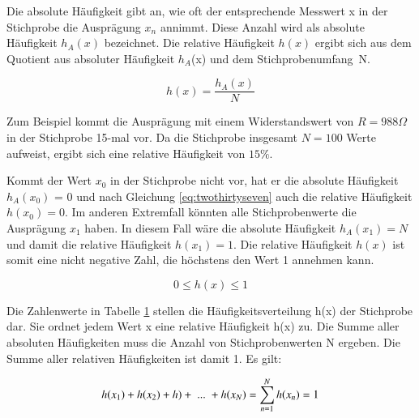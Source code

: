 \begin{table}[H]
{\begin{tabular}{| c | c | c | c | c | c |}
\parbox[c][0.28in][c]{0.97in}{} &
\parbox[c][0.28in][c]{0.97in}{} &
\parbox[c][0.28in][c]{0.97in}{} &
\parbox[c][0.28in][c]{0.97in}{} &
\parbox[c][0.28in][c]{0.97in}{} &
\parbox[c][0.28in][c]{0.97in}{} \\ \hline

\end{tabular}%
}\bigskip
\label{tab:threethree}
\end{table}

\noindent Die absolute H\"{a}ufigkeit gibt an, wie oft der entsprechende Messwert x in der Stichprobe die Auspr\"{a}gung $x{}_{n}$ annimmt. Diese Anzahl wird als absolute H\"{a}ufigkeit $h{}_{A}(x)$ bezeichnet. Die relative H\"{a}ufigkeit $h(x)$ ergibt sich aus dem Quotient aus absoluter H\"{a}ufigkeit $h{}_{A}$(x) und dem Stichprobenumfang~N.

\begin{equation}\label{eq:threetwo}
h(x)=\dfrac{h_{A} (x)}{N} 
\end{equation}

\noindent Zum Beispiel kommt die Auspr\"{a}gung mit einem Widerstandswert von $R = 988 \Omega$ in der Stichprobe 15-mal vor. Da die Stichprobe insgesamt $N = 100$ Werte aufweist, ergibt sich eine relative H\"{a}ufigkeit von $15 \%$.

\noindent Kommt der Wert $x_{0}$ in der Stichprobe nicht vor, hat er die absolute H\"{a}ufigkeit $h_{A}(x_{0})$ = 0 und nach Gleichung \eqref{eq:twothirtyseven} auch die relative H\"{a}ufigkeit $h(x_{0}) = 0$. Im anderen Extremfall k\"{o}nnten alle Stichprobenwerte die Auspr\"{a}gung $x_{1}$ haben. In diesem Fall w\"{a}re die absolute H\"{a}ufigkeit $h_{A}(x_{1}) = N$ und damit die relative H\"{a}ufigkeit $h(x_{1}) = 1$. Die relative H\"{a}ufigkeit $h(x)$ ist somit eine nicht negative Zahl, die h\"{o}chstens den Wert 1 annehmen kann.

\begin{equation}\label{eq:threethree}
0\le h(x)\le 1
\end{equation}

\noindent Die Zahlenwerte in Tabelle \ref{tab:threethree} stellen die H\"{a}ufigkeitsverteilung h(x) der Stichprobe dar. Sie ordnet jedem Wert x eine relative H\"{a}ufigkeit h(x) zu. Die Summe aller absoluten H\"{a}ufigkeiten muss die Anzahl von Stichprobenwerten N ergeben. Die Summe aller relativen H\"{a}ufigkeiten ist damit 1. Es gilt: 

\begin{equation}\label{eq:threefour}
h(x_{1})+h(x_{2} )+h)+{\rm \; ...\; }+h(x_{N})=\sum _{n=1}^{N}h(x_{n} )=1
\end{equation}

